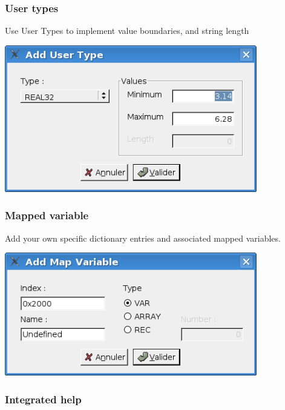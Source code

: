 \documentclass[12pt,english,a4paper]{book}
\begin{document}
\subsubsection{User types}

Use User Types to implement value boundaries, and string length

\begin{center}
\includegraphics[width=11cm]{Pictures/10000201000001C40000010766961D7F} 
\par\end{center}


\subsubsection{Mapped variable}

Add your own specific dictionary entries and associated mapped variables.

\begin{center}
\includegraphics[width=11cm]{Pictures/10000201000001C4000000DD129D4661} 
\par\end{center}


\subsubsection{Integrated help}
\end{document}
